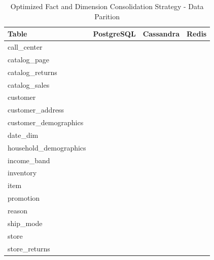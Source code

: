 \documentclass[conference]{IEEEtran}
\begin{document}
\begin{table}[htbp]
	\caption{Optimized Fact and Dimension Consolidation Strategy - Data Parition}
	\begin{center}
		\begin{tabular}{|l|c|c|c|}
			\hline
			\textbf{Table}          & \textbf{PostgreSQL} & \textbf{Cassandra} & \textbf{Redis} \\
			\hline
			call\_center            &                     & \checkmark         &                \\
			catalog\_page           &                     & \checkmark         &                \\
			catalog\_returns        &                     & \checkmark         &                \\
			catalog\_sales          &                     & \checkmark         &                \\
			customer                &                     & \checkmark         &                \\
			customer\_address       &                     & \checkmark         &                \\
			customer\_demographics  &                     & \checkmark         &                \\
			date\_dim               & \checkmark          &                    &                \\
			household\_demographics &                     & \checkmark         &                \\
			income\_band            &                     &                    & \checkmark     \\
			inventory               & \checkmark          &                    &                \\
			item                    & \checkmark          &                    &                \\
			promotion               &                     &                    & \checkmark     \\
			reason                  &                     &                    & \checkmark     \\
			ship\_mode              &                     &                    & \checkmark     \\
			store                   & \checkmark          &                    &                \\
			store\_returns          & \checkmark          &                    &                \\

\end{tabular}
\end{center}
\end{table}
\end{document}
